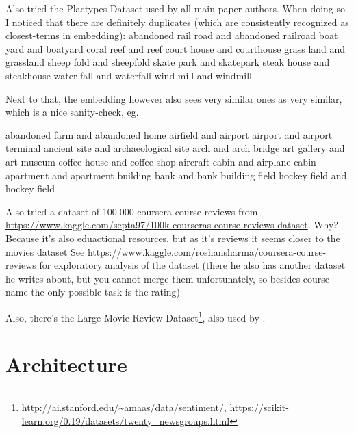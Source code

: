 \documentclass[11pt,
  paper=a4, 
  twoside,  %
  hidelinks,
  bibliography=totocnumbered,
	captions=tableheading,
	BCOR=10mm
]{scrreprt}
\theoremstyle{definition}
\begin{document}
Also tried the Plactypes-Dataset used by all main-paper-authors. When doing so I noticed that there are definitely duplicates (which are consistently recognized as closest-terms in embedding):
  abandoned rail road and abandoned railroad
  boat yard and boatyard
  coral reef and reef
  court house and courthouse
  grass land and grassland
  sheep fold and sheepfold
  skate park and skatepark
  steak house and steakhouse
  water fall and waterfall
  wind mill and windmill

Next to that, the embedding however also sees very similar ones as very similar, which is a nice sanity-check, eg.

  abandoned farm and abandoned home
  airfield and airport
  airport and airport terminal
  ancient site and archaeological site
  arch and arch bridge
  art gallery and art museum
  coffee house and coffee shop
  aircraft cabin and airplane cabin
  apartment and apartment building
  bank and bank building
  field hockey field and hockey field


Also tried a dataset of 100.000 coursera course reviews from \url{https://www.kaggle.com/septa97/100k-courseras-course-reviews-dataset}. Why? Because it's also eduactional resources, but as it's reviews it seems closer to the movies dataset
See \url{https://www.kaggle.com/roshansharma/coursera-course-reviews} for exploratory analysis of the dataset (there he also has another dataset he writes about, but you cannot merge them unfortunately, so besides course name the only possible task is the rating)

Also, there's the Large Movie Review Dataset\footnote{\url{http://ai.stanford.edu/~amaas/data/sentiment/}, \url{https://scikit-learn.org/0.19/datasets/twenty_newsgroups.html}}, also used by \cite{Ager2018}.


\section{Architecture}
\label{sec:architecture}

\end{document}
